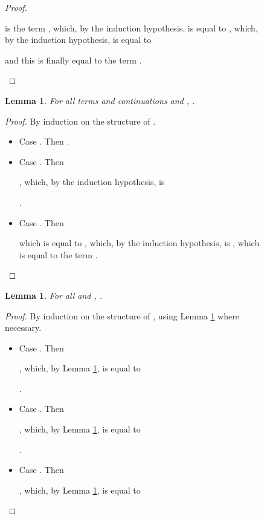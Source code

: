 \documentclass{LMCS}
\newtheorem{lemma}[theorem]{Lemma}
\begin{document}
\begin{figure}
{\begin{proof}
\begin{myenumerate}
\begin{itemize}
	  is the term
	  ,
	  which, by the induction hypothesis, is equal to
	  ,
	  which, by the induction hypothesis, is equal to
	  
	  and this is finally equal to the term
	  .
	  \qedhere
      \end{itemize}
  \end{myenumerate}
\end{proof}

\begin{lemma}\label{lem:continuation-composition}
  For all terms  and continuations
   and , 
  .
\end{lemma}
\begin{proof}
  By induction on the structure of . 
  \begin{itemize}
    \item Case . Then .
    \item Case . Then 
      
      ,
      which, by the induction hypothesis, is 
      
      .

    \item Case . Then 
      
      which is equal to
      ,
      which, by the induction hypothesis, is 
      , which is equal to the term
      .
      \qedhere
  \end{itemize}
\end{proof}

\begin{lemma}\label{lem:continuation-substitution}
  For all  and ,
  .
\end{lemma}
\begin{proof}
  By induction on the structure of , using Lemma \ref{lem:continuation-composition}
  where necessary.
  \begin{itemize}
    \item Case . Then 
      
      ,
      which, by Lemma \ref{lem:continuation-composition}, is equal to
      
      .

    \item Case . Then 
      
      ,
      which, by Lemma \ref{lem:continuation-composition}, is equal to
      
      .

    \item Case . Then 
      
      ,
      which, by Lemma \ref{lem:continuation-composition}, is equal to
      

\end{itemize}
\end{proof}}
\end{figure}
\end{document}

